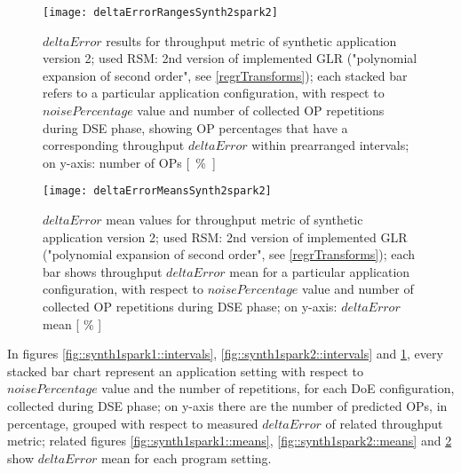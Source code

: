 \begin{figure}[H]

    \centering
    
    \texttt{[image: deltaErrorRangesSynth2spark2]}
    
     \caption[$deltaError$ results for throughput metric of synthetic application version 2; used RSM: 2nd version of implemented GLR ("polynomial expansion of second order")]{$deltaError$ results for throughput metric of synthetic application version 2; used RSM: 2nd version of implemented GLR ("polynomial expansion of second order", see \ref{regrTransforms}); each stacked bar refers to a particular application configuration, with respect to $noisePercentage$ value and number of collected OP repetitions during DSE phase, showing OP percentages that have a corresponding throughput $deltaError$ within prearranged intervals; on y-axis: number of OPs \hbox{[ \% ]}}
    
    \label{fig::synth2spark2::intervals}
    
\end{figure}

\begin{figure}[H]

    \centering
    
    \texttt{[image: deltaErrorMeansSynth2spark2]}
    
    \caption[$deltaError$ mean values for throughput metric of synthetic application version 2; used RSM: 2nd version of implemented GLR ("polynomial expansion of second order")]{$deltaError$ mean values for throughput metric of synthetic application version 2; used RSM: 2nd version of implemented GLR ("polynomial expansion of second order", see \ref{regrTransforms}); each bar shows throughput $deltaError$ mean for a particular application configuration, with respect to $noisePercentage$ value and number of collected OP repetitions during DSE phase; on y-axis: $deltaError$ mean [ \% ]}
    
    \label{fig::synth2spark2::means}
    
\end{figure}





In figures \ref{fig::synth1spark1::intervals}, \ref{fig::synth1spark2::intervals} and \ref{fig::synth2spark2::intervals}, every stacked bar chart represent an application setting with respect to $noisePercentage$ value and the number of repetitions, for each DoE configuration, collected during DSE phase; on y-axis there are the number of predicted OPs, in percentage, grouped with respect to measured $deltaError$ of related throughput metric; related figures \ref{fig::synth1spark1::means}, \ref{fig::synth1spark2::means} and \ref{fig::synth2spark2::means} show $deltaError$ mean for each program setting.

